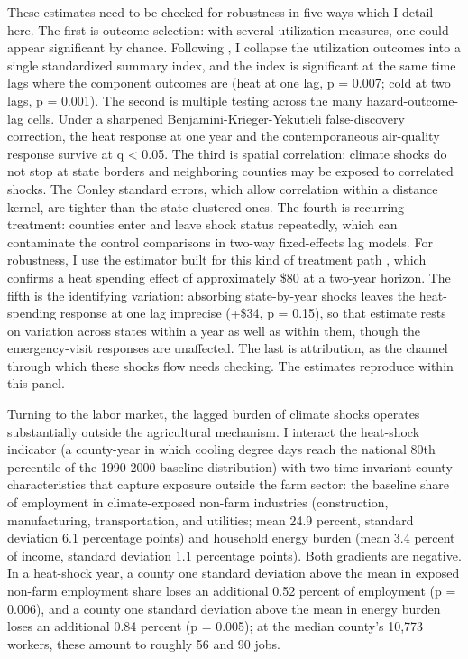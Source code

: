 \documentclass[a4paper,11pt]{article}
\begin{document}
These estimates need to be checked for robustness in five ways which I detail here. The first is outcome selection: with several utilization measures, one could appear significant by chance. Following \citet{anderson2008multiple}, I collapse the utilization outcomes into a single standardized summary index, and the index is significant at the same time lags where the component outcomes are (heat at one lag, p = 0.007; cold at two lags, p = 0.001). The second is multiple testing across the many hazard-outcome-lag cells. Under a sharpened Benjamini-Krieger-Yekutieli false-discovery correction, the heat response at one year and the contemporaneous air-quality response survive at q < 0.05. \citep{benjamini2006adaptive} The third is spatial correlation:  climate shocks do not stop at state borders and neighboring counties may be exposed to correlated shocks. The Conley standard errors, which allow correlation within a distance kernel, are tighter than the state-clustered ones. The fourth is recurring treatment: counties enter and leave shock status repeatedly, which can contaminate the control comparisons in two-way fixed-effects lag models. For robustness, I use the estimator built for this kind of treatment path \citep{dechaisemartin2026intertemporal}, which confirms a heat spending effect of approximately \$80 at a two-year horizon. The fifth is the identifying variation: absorbing state-by-year shocks leaves the heat-spending response at one lag imprecise (+\$34, p = 0.15), so that estimate rests on variation across states within a year as well as within them, though the emergency-visit responses are unaffected. The last is attribution, as the channel through which these shocks flow needs checking. The estimates reproduce \citet{deryugina2019mortality} within this panel.

Turning to the labor market, the lagged burden of climate shocks operates substantially outside the agricultural mechanism. I interact the heat-shock indicator (a county-year in which cooling degree days reach the national 80th percentile of the 1990-2000 baseline distribution) with two time-invariant county characteristics that capture exposure outside the farm sector: the baseline share of employment in climate-exposed non-farm industries (construction, manufacturing, transportation, and utilities; mean 24.9 percent, standard deviation 6.1 percentage points) and household energy burden (mean 3.4 percent of income, standard deviation 1.1 percentage points). Both gradients are negative. In a heat-shock year, a county one standard deviation above the mean in exposed non-farm employment share loses an additional 0.52 percent of employment (p = 0.006), and a county one standard deviation above the mean in energy burden loses an additional 0.84 percent (p = 0.005); at the median county's 10,773 workers, these amount to roughly 56 and 90 jobs.
\end{document}
